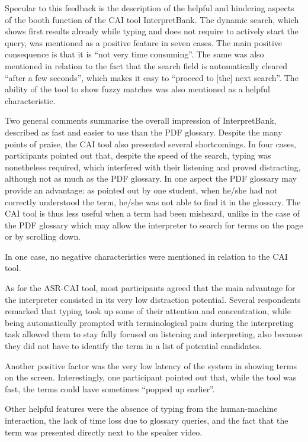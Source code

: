 Specular to this feedback is the description of the helpful and hindering aspects of the booth function of the CAI tool InterpretBank. The dynamic search, which shows first results already while typing and does not require to actively start the query, was mentioned as a positive feature in seven cases. The main positive consequence is that it is ``not very time consuming''. The same was also mentioned in relation to the fact that the search field is automatically cleared ``after a few seconds'', which makes it easy to ``proceed to [the] next search''. The ability of the tool to show fuzzy matches was also mentioned as a helpful characteristic.

Two general comments summarise the overall impression of InterpretBank, described as fast and easier to use than the PDF glossary. Despite the many points of praise, the CAI tool also presented several shortcomings. In four cases, participants pointed out that, despite the speed of the search, typing was nonetheless required, which interfered with their listening and proved distracting, although not as much as the PDF glossary. In one aspect the PDF glossary may provide an advantage: as pointed out by one student, when he/she had not correctly understood the term, he/she was not able to find it in the glossary. The CAI tool is thus less useful when a term had been misheard, unlike in the case of the PDF glossary which may allow the interpreter to search for terms on the page or by scrolling down.

In one case, no negative characteristics were mentioned in relation to the CAI tool.

As for the ASR-CAI tool, most participants agreed that the main advantage for the interpreter consisted in its very low distraction potential. Several respondents remarked that typing took up some of their attention and concentration, while being automatically prompted with terminological pairs during the interpreting task allowed them to stay fully focused on listening and interpreting, also because they did not have to identify the term in a list of potential candidates.

Another positive factor was the very low latency of the system in showing terms on the screen. Interestingly, one participant pointed out that, while the tool was fast, the terms could have sometimes ``popped up earlier''.

Other helpful features were the absence of typing from the human-machine interaction, the lack of time loss due to glossary queries, and the fact that the term was presented directly next to the speaker video.

